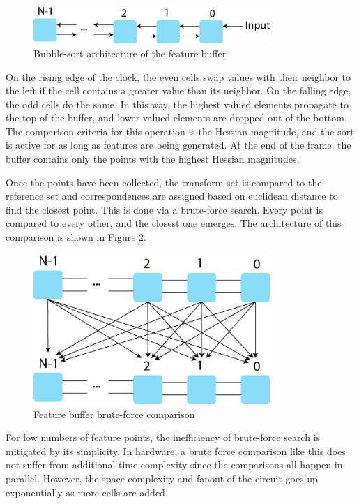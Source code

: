 \documentclass{article}
\begin{document}
\begin{figure}[h]
	\centering
	\includegraphics[width=0.8\textwidth]{figures/block/bubblesort}
	\caption{Bubble-sort architecture of the feature buffer}
	\label{fig_bubblesort}
\end{figure}

On the rising edge of the clock, the even cells swap values with their neighbor to the left if the cell contains a greater value than its neighbor. On the falling edge, the odd cells do the same. In this way, the highest valued elements propagate to the top of the buffer, and lower valued elements are dropped out of the bottom. The comparison criteria for this operation is the Hessian magnitude, and the sort is active for as long as features are being generated. At the end of the frame, the buffer contains only the points with the highest Hessian magnitudes.

Once the points have been collected, the transform set is compared to the reference set and correspondences are assigned based on euclidean distance to find the closest point. This is done via a brute-force search. Every point is compared to every other, and the closest one emerges. The architecture of this comparison is shown in Figure \ref{fig_comparison}.

\begin{figure}[h]
	\centering
	\includegraphics[width=0.8\textwidth]{figures/block/comparison}
	\caption{Feature buffer brute-force comparison}
	\label{fig_comparison}
\end{figure}

For low numbers of feature points, the inefficiency of brute-force search is mitigated by its simplicity. In hardware, a brute force comparison like this does not suffer from additional time complexity since the comparisons all happen in parallel. However, the space complexity and fanout of the circuit goes up exponentially as more cells are added.
\end{document}
